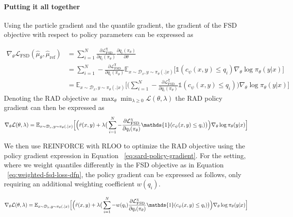 \paragraph{Putting it all together} Using the particle gradient and the quantile gradient, the gradient of the FSD objective with respect to policy parameters can be expressed as

\begin{align}
  \nabla_{\theta} \mathcal{L}_{\mathrm{FSD}}(\hat{\mu}_{\theta}, \hat{\mu}_{\mathrm{ref}}) &= \sum_{i=1}^{N} \frac{\partial \mathcal{L}^{\chi}_{\mathrm{FSD}}}{\partial q_i(\pi_{\theta})} \frac{\partial q_i(\pi_{\theta})}{\partial \theta} \\
  &= \sum_{i=1}^{N} -\frac{\partial \mathcal{L}^{\chi}_{\mathrm{FSD}}}{\partial q_i(\pi_{\theta})} \mathbb{E}_{x \sim \mathcal{D}_{x}, y \sim \pi_{\theta}(. \vert x)} \Big[ \mathds{1}(c_{\psi}(x,y) \leq q_i) \nabla_{\theta} \log \pi_{\theta}(y \vert x)\Big]\\
  &=\mathbb{E}_{x \sim \mathcal{D}_{x}, y \sim \pi_{\theta}(. \vert x)}\Big[ \Big(\sum_{i=1}^{N} -\frac{\partial \mathcal{L}^{\chi}_{\mathrm{FSD}}}{\partial q_i(\pi_{\theta})} \mathds{1}(c_{\psi}(x,y) \leq q_i)\Big) \nabla_{\theta} \log \pi_{\theta}(y \vert x)\Big] \label{eq:fsd-gradient}
\end{align}
Denoting the RAD objective as $\max_{\theta} \min_{\lambda \geq 0} \mathcal{L}(\theta, \lambda)$ the RAD policy gradient can then be expressed as
\begin{equation}
  \nabla_{\theta} \mathcal{L}(\theta, \lambda) = \mathbb{E}_{x \sim \mathcal{D}_{x}, y \sim \pi_{\theta}(. \vert x)}\Big[ \Big( \Tilde{r}(x,y) + \lambda \big(\sum_{i=1}^{N} -\frac{\partial \mathcal{L}^{\chi}_{\mathrm{FSD}}}{\partial q_i(\pi_{\theta})} \mathds{1}(c_{\psi}(x,y) \leq q_i)\big)\Big) \nabla_{\theta} \log \pi_{\theta}(y \vert x)\Big]
  \label{eq:sard-policy-gradient}
\end{equation}

We then use REINFORCE \citep{williams1992simple} with RLOO \citep{Kool2019Buy4R} to optimize the RAD objective using the policy gradient expression in Equation ~\ref{eq:sard-policy-gradient}. For the setting, where we weight quantiles differently in the FSD objective as in Equation ~\ref{eq:weighted-fsd-loss-dfn}, the policy gradient can be expressed as follows, only requiring an additional weighting coefficient $w(q_i)$.

\begin{equation}
  \nabla_{\theta} \mathcal{L}(\theta, \lambda) = \mathbb{E}_{x \sim \mathcal{D}_{x}, y \sim \pi_{\theta}(. \vert x)}\Big[ \Big( \Tilde{r}(x,y) + \lambda \big(\sum_{i=1}^{N} -w(q_i) \frac{\partial \mathcal{L}^{\chi}_{\mathrm{FSD}}}{\partial q_i(\pi_{\theta})} \mathds{1}(c_{\psi}(x,y) \leq q_i)\big)\Big) \nabla_{\theta} \log \pi_{\theta}(y \vert x)\Big]
  \label{eq:weighted-sard-policy-gradient}
\end{equation}

